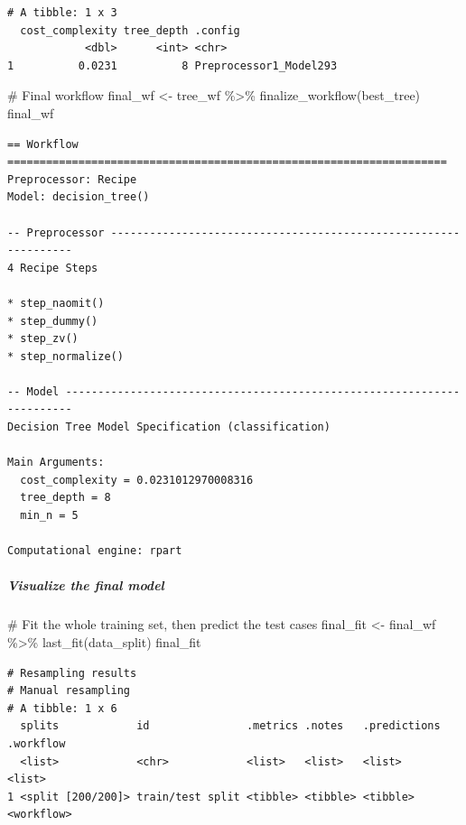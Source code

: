 \documentclass[
]{article}
\let\oldsubparagraph\subparagraph
\renewcommand{\subparagraph}[1]{\oldsubparagraph{#1}\mbox{}}
\newenvironment{Shaded}{\begin{snugshade}}{\end{snugshade}}
\newcommand{\CommentTok}[1]{\textcolor[rgb]{0.37,0.37,0.37}{#1}}
\newcommand{\FunctionTok}[1]{\textcolor[rgb]{0.28,0.35,0.67}{#1}}
\newcommand{\NormalTok}[1]{\textcolor[rgb]{0.00,0.23,0.31}{#1}}
\newcommand{\OtherTok}[1]{\textcolor[rgb]{0.00,0.23,0.31}{#1}}
\newcommand{\SpecialCharTok}[1]{\textcolor[rgb]{0.37,0.37,0.37}{#1}}
\begin{document}
\begin{verbatim}
# A tibble: 1 x 3
  cost_complexity tree_depth .config               
            <dbl>      <int> <chr>                 
1          0.0231          8 Preprocessor1_Model293
\end{verbatim}

\begin{Shaded}
\begin{Highlighting}[]
\CommentTok{\# Final workflow}
\NormalTok{final\_wf }\OtherTok{\textless{}{-}}\NormalTok{ tree\_wf }\SpecialCharTok{\%\textgreater{}\%}
  \FunctionTok{finalize\_workflow}\NormalTok{(best\_tree)}
\NormalTok{final\_wf}
\end{Highlighting}
\end{Shaded}

\begin{verbatim}
== Workflow ====================================================================
Preprocessor: Recipe
Model: decision_tree()

-- Preprocessor ----------------------------------------------------------------
4 Recipe Steps

* step_naomit()
* step_dummy()
* step_zv()
* step_normalize()

-- Model -----------------------------------------------------------------------
Decision Tree Model Specification (classification)

Main Arguments:
  cost_complexity = 0.0231012970008316
  tree_depth = 8
  min_n = 5

Computational engine: rpart 
\end{verbatim}

\hypertarget{visualize-the-final-model-2}{%
\subparagraph{Visualize the final
model}\label{visualize-the-final-model-2}}

\begin{Shaded}
\begin{Highlighting}[]
\CommentTok{\# Fit the whole training set, then predict the test cases}
\NormalTok{final\_fit }\OtherTok{\textless{}{-}} 
\NormalTok{  final\_wf }\SpecialCharTok{\%\textgreater{}\%}
  \FunctionTok{last\_fit}\NormalTok{(data\_split)}
\NormalTok{final\_fit}
\end{Highlighting}
\end{Shaded}

\begin{verbatim}
# Resampling results
# Manual resampling 
# A tibble: 1 x 6
  splits            id               .metrics .notes   .predictions .workflow 
  <list>            <chr>            <list>   <list>   <list>       <list>    
1 <split [200/200]> train/test split <tibble> <tibble> <tibble>     <workflow>
\end{verbatim}
\end{document}
